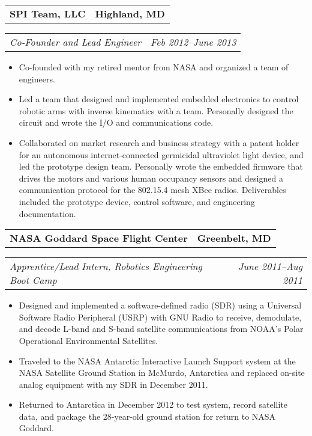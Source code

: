 \documentclass[10pt,letterpaper]{article}
\newcommand{\headerrow}[2]{%
    \begin{tabularx}{\linewidth}{Xr}
	    #1 & #2 \\
    \end{tabularx}
}
\begin{document}
	\headerrow{\textbf{SPI Team, LLC}}{\textbf{Highland, MD}}
	\headerrow{\textit{Co-Founder and Lead Engineer}}
		{\textit{Feb 2012--June 2013}}
    \begin{itemize}[label=--]
        \item Co-founded with my retired mentor from NASA and organized a team
            of engineers.

        \item Led a team that designed and implemented embedded electronics to
            control robotic arms with inverse kinematics with a team.
            Personally designed the circuit and wrote the I/O and
            communications code.

        \item Collaborated on market research and business strategy with a
            patent holder for an autonomous internet-connected germicidal
            ultraviolet light device, and led the prototype design team.
            Personally wrote the embedded firmware that drives the motors and
            various human occupancy sensors and designed a communication
            protocol for the 802.15.4 mesh XBee radios.  Deliverables included
            the prototype device, control software, and engineering
            documentation.
	\end{itemize}

	\headerrow{\textbf{NASA Goddard Space Flight Center}}{\textbf{Greenbelt, MD}}
	\headerrow{\textit{Apprentice/Lead Intern, Robotics Engineering Boot Camp}}
		{\textit{June 2011--Aug 2011}}
    \begin{itemize}[label=--]
        \item Designed and implemented a software-defined radio (SDR) using a
            Universal Software Radio Peripheral (USRP) with GNU Radio to
            receive, demodulate, and decode L-band and S-band satellite
            communications from NOAA's Polar Operational Environmental
            Satellites.

        \item Traveled to the NASA Antarctic Interactive Launch Support
            system at the NASA Satellite Ground Station in McMurdo, Antarctica
            and replaced on-site analog equipment with my SDR in December 2011.

        \item Returned to Antarctica in December 2012 to test system, record
            satellite data, and package the 28-year-old ground station for
            return to NASA Goddard.
	\end{itemize}
\end{document}
